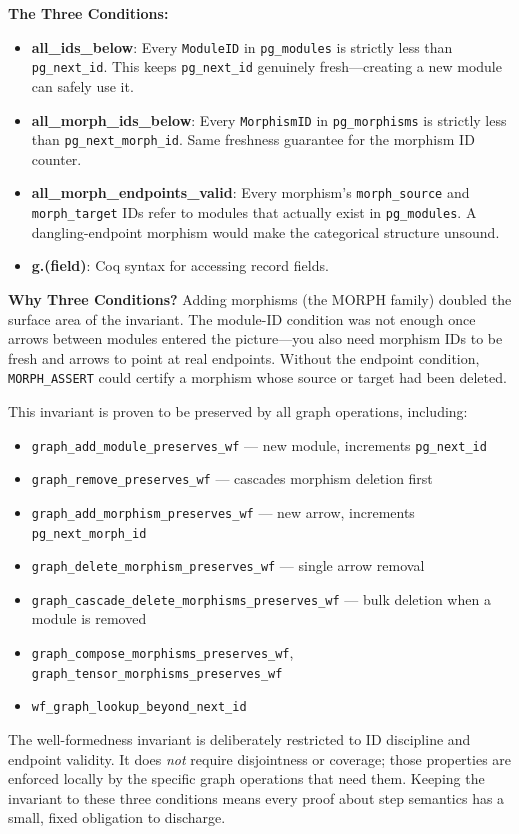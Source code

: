 \textbf{The Three Conditions:}
\begin{itemize}
    \item \textbf{all\_ids\_below}: Every \texttt{ModuleID} in \texttt{pg\_modules} is strictly less than \texttt{pg\_next\_id}. This keeps \texttt{pg\_next\_id} genuinely fresh—creating a new module can safely use it.
    \item \textbf{all\_morph\_ids\_below}: Every \texttt{MorphismID} in \texttt{pg\_morphisms} is strictly less than \texttt{pg\_next\_morph\_id}. Same freshness guarantee for the morphism ID counter.
    \item \textbf{all\_morph\_endpoints\_valid}: Every morphism's \texttt{morph\_source} and \texttt{morph\_target} IDs refer to modules that actually exist in \texttt{pg\_modules}. A dangling-endpoint morphism would make the categorical structure unsound.
    \item \textbf{g.(field)}: Coq syntax for accessing record fields.
\end{itemize}

\textbf{Why Three Conditions?} Adding morphisms (the MORPH family) doubled the surface area of the invariant. The module-ID condition was not enough once arrows between modules entered the picture—you also need morphism IDs to be fresh and arrows to point at real endpoints. Without the endpoint condition, \texttt{MORPH\_ASSERT} could certify a morphism whose source or target had been deleted.

This invariant is proven to be preserved by all graph operations, including:
\begin{itemize}
    \item \texttt{graph\_add\_module\_preserves\_wf} — new module, increments \texttt{pg\_next\_id}
    \item \texttt{graph\_remove\_preserves\_wf} — cascades morphism deletion first
    \item \texttt{graph\_add\_morphism\_preserves\_wf} — new arrow, increments \texttt{pg\_next\_morph\_id}
    \item \texttt{graph\_delete\_morphism\_preserves\_wf} — single arrow removal
    \item \texttt{graph\_cascade\_delete\_morphisms\_preserves\_wf} — bulk deletion when a module is removed
    \item \texttt{graph\_compose\_morphisms\_preserves\_wf}, \texttt{graph\_tensor\_morphisms\_preserves\_wf}
    \item \texttt{wf\_graph\_lookup\_beyond\_next\_id}
\end{itemize}
The well-formedness invariant is deliberately restricted to ID discipline and endpoint validity. It does \emph{not} require disjointness or coverage; those properties are enforced locally by the specific graph operations that need them. Keeping the invariant to these three conditions means every proof about step semantics has a small, fixed obligation to discharge.


